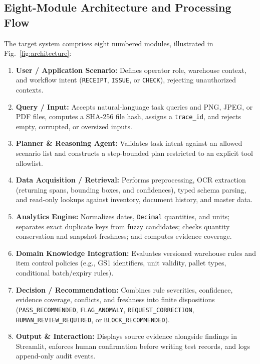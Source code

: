 \documentclass[conference]{IEEEtran}
\begin{document}
\subsection{Eight-Module Architecture and Processing Flow}
The target system comprises eight numbered modules, illustrated in Fig.~\ref{fig:architecture}:
\begin{enumerate}
    \item \textbf{User / Application Scenario:} Defines operator role, warehouse context, and workflow intent (\texttt{RECEIPT}, \texttt{ISSUE}, or \texttt{CHECK}), rejecting unauthorized contexts.
    \item \textbf{Query / Input:} Accepts natural-language task queries and PNG, JPEG, or PDF files, computes a SHA-256 file hash, assigns a \texttt{trace\_\allowbreak id}, and rejects empty, corrupted, or oversized inputs.
    \item \textbf{Planner \& Reasoning Agent:} Validates task intent against an allowed scenario list and constructs a step-bounded plan restricted to an explicit tool allowlist.
    \item \textbf{Data Acquisition / Retrieval:} Performs preprocessing, OCR extraction (returning spans, bounding boxes, and confidences), typed schema parsing, and read-only lookups against inventory, document history, and master data.
    \item \textbf{Analytics Engine:} Normalizes dates, \texttt{Decimal} quantities, and units; separates exact duplicate keys from fuzzy candidates; checks quantity conservation and snapshot freshness; and computes evidence coverage.
    \item \textbf{Domain Knowledge Integration:} Evaluates versioned warehouse rules and item control policies (e.g., GS1 identifiers, unit validity, pallet types, conditional batch/expiry rules).
    \item \textbf{Decision / Recommendation:} Combines rule severities, confidence, evidence coverage, conflicts, and freshness into finite dispositions (\texttt{PASS\_\allowbreak RECOMMENDED}, \texttt{FLAG\_\allowbreak ANOMALY}, \texttt{REQUEST\_\allowbreak CORRECTION}, \texttt{HUMAN\_\allowbreak REVIEW\_\allowbreak REQUIRED}, or \texttt{BLOCK\_\allowbreak RECOMMENDED}).
    \item \textbf{Output \& Interaction:} Displays source evidence alongside findings in Streamlit, enforces human confirmation before writing test records, and logs append-only audit events.
\end{enumerate}
\end{document}
